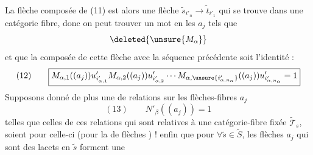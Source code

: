 La flèche composée de (11) est alors une flèche $\widetilde s_{i'_n}\longrightarrow\widetilde t_{i'_1}$ qui se trouve dans une catégorie fibre, donc  on peut trouver un mot  en les $a_j$ tels que
\[\deleted{\unsure{M_\alpha}}\]
et que la composée de  cette flèche avec la séquence précédente soit l'identité :
\[(12)\qquad\boxed{M_{\alpha,1}((a_j))u'_{i'_{\alpha,1}}M_{\alpha,2}((a_j))u'_{i'_{\alpha,2}}\cdots M_{\alpha,\unsure{i'_{\alpha,n_\alpha}}}((a_j))u'_{i'_{\alpha,n_\alpha}}=1}\]
Supposons donné de plus une  de relations sur les flèches-fibres $a_j$
\[(13)\qquad\boxed{N'_\beta((a_j))=1}\]
telles que celles de ces relations qui sont relatives à une catégorie-fibre fixée $\widetilde{\mathcal T}_s$, soient  pour celle-ci (pour la  de flèches ) !  enfin que pour $\forall\widetilde s\in\widetilde S$, les  flèches $a_j$ qui sont des lacets en $\widetilde s$ forment une
